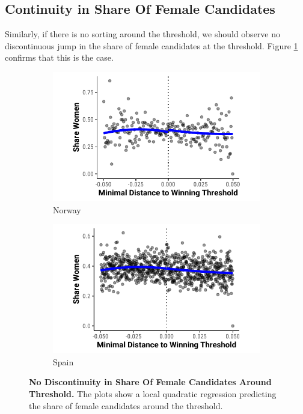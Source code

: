 \documentclass[12pt]{article}
\begin{document}
\pagebreak
\subsection{Continuity in Share Of Female Candidates}
\label{app:density_covariates}

Similarly, if there is no sorting around the threshold, we should observe no discontinuous jump in the share of female candidates at the threshold. Figure \ref{fig:density_covariates} confirms that this is the case.

\begin{figure}[!htb]
    \centering
    \begin{subfigure}[t]{0.48\textwidth}
    \includegraphics[width = 1 \textwidth]{../output/figures/norway_share_female.pdf}
    \caption{Norway}
    \end{subfigure}%
    \begin{subfigure}[t]{0.48\textwidth}
    \includegraphics[width = 1 \textwidth]{../output/figures/spain_share_female.pdf}
    \caption{Spain}
    \end{subfigure}
    \caption{\textbf{No Discontinuity in Share Of Female Candidates Around Threshold.} The plots show a local quadratic regression predicting the share of female candidates around the threshold.}
    \label{fig:density_covariates}
\end{figure}
\end{document}
